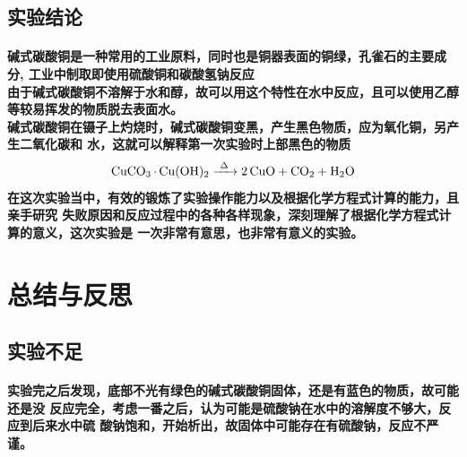 \documentclass[final,11pt,oneside,UTF8]{report}
\begin{document}
\subsection{实验结论}
\paragraph{
碱式碳酸铜是一种常用的工业原料，同时也是铜器表面的铜绿，孔雀石的主要成分,
工业中制取即使用硫酸铜和碳酸氢钠反应\\
由于碱式碳酸铜不溶解于水和醇，故可以用这个特性在水中反应，且可以使用乙醇
等较易挥发的物质脱去表面水。\\
碱式碳酸铜在镊子上灼烧时，碱式碳酸铜变黑，产生黑色物质，应为氧化铜，另产生二氧化碳和
水，这就可以解释第一次实验时上部黑色的物质\\
$$\ce{CuCO3 * Cu(OH)2 ->[$\Delta$] 2CuO + CO2 + H2O}$$
在这次实验当中，有效的锻炼了实验操作能力以及根据化学方程式计算的能力，且亲手研究
失败原因和反应过程中的各种各样现象，深刻理解了根据化学方程式计算的意义，这次实验是
一次非常有意思，也非常有意义的实验。\\
}
\section{总结与反思}
\subsection{实验不足}
\paragraph{
    实验完之后发现，底部不光有绿色的碱式碳酸铜固体，还是有蓝色的物质，故可能还是没
    反应完全，考虑一番之后，认为可能是硫酸钠在水中的溶解度不够大，反应到后来水中硫
    酸钠饱和，开始析出，故固体中可能存在有硫酸钠，反应不严谨。
}
\end{document}
